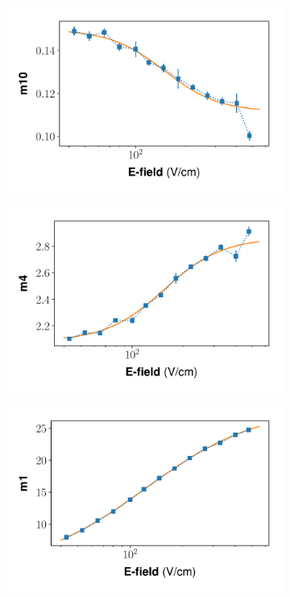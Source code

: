 \begin{figure}[h!]
\centering
\begin{subfigure}{0.45\textwidth}
  \centering
  \includegraphics[width=\textwidth]{Figures/Yields_fit_old/NEST_m10_fit_old.pdf}
  \caption{}
\end{subfigure}%
\begin{subfigure}{0.45\textwidth}
  \centering
  \includegraphics[width=\textwidth]{Figures/Yields_fit_old/NEST_m4_fit_old.pdf}
  \caption{}
\end{subfigure}
\begin{subfigure}{0.45\textwidth}
  \centering
  \includegraphics[width=\textwidth]{Figures/Yields_fit_old/NEST_m1_fit_old.pdf}

\end{subfigure}
\end{figure}
